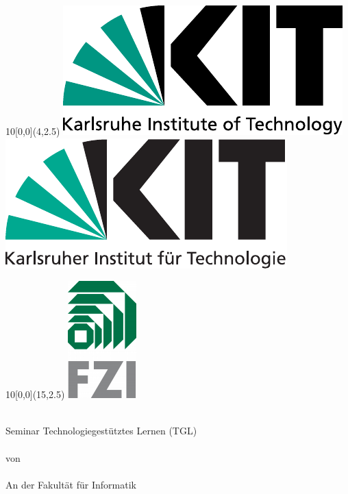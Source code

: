 
\newcommand{\diameter}{20}
\newcommand{\xone}{-15}
\newcommand{\xtwo}{160}
\newcommand{\yone}{15}
\newcommand{\ytwo}{-253}

\begin{titlepage}
	\begin{textblock}{10}[0,0](4,2.5)
			{\includegraphics[width=.3\textwidth]{logos/KITLogo_EN_RGB.pdf}}
			{\includegraphics[width=.3\textwidth]{logos/KITLogo_DE_RGB.pdf}}		
	\end{textblock}
	\begin{textblock}{10}[0,0](15,2.5)
		\includegraphics[width=.1\textwidth]{logos/FZI_Logo.png}
	\end{textblock}
	\vspace*{3.5cm}
	\begin{center}
		\Huge{\mytitle}
		\vspace*{2cm}\\
		\Large{
			Seminar Technologiegestütztes Lernen (TGL) \\
								{\mytype\\von}
		}\\
		\vspace*{1cm}
		\huge{\myname}\\
		\vspace*{1cm}
		\Large{
							    {An der Fakult\"at f\"ur Informatik}
			\\
			\myinstitute
		}
	\end{center}
	\vspace*{3cm}

\end{titlepage}

